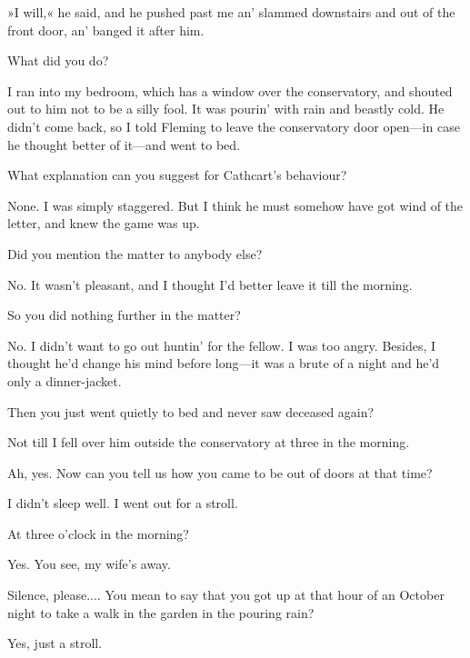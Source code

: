 \begin{dialogue}
»I will,« he said, and he pushed past me an' slammed downstairs and out of the front door, an' banged it after him.

 What did you do?

 I ran into my bedroom, which has a window over the conservatory, and shouted out to him not to be a silly fool. It was pourin' with rain and beastly cold. He didn't come back, so I told Fleming to leave the conservatory door open\allowbreak---\allowbreak in case he thought better of it\allowbreak---\allowbreak and went to bed.

 What explanation can you suggest for Cathcart's behaviour?

 None. I was simply staggered. But I think he must somehow have got wind of the letter, and knew the game was up.

 Did you mention the matter to anybody else?

 No. It wasn't pleasant, and I thought I'd better leave it till the morning.

 So you did nothing further in the matter?

 No. I didn't want to go out huntin' for the fellow. I was too angry. Besides, I thought he'd change his mind before long\allowbreak---\allowbreak it was a brute of a night and he'd only a dinner-jacket.

 Then you just went quietly to bed and never saw deceased again?

 Not till I fell over him outside the conservatory at three in the morning.

 Ah, yes. Now can you tell us how you came to be out of doors at that time?

  I didn't sleep well. I went out for a stroll.

 At three o'clock in the morning?

 Yes.  You see, my wife's away. 

 Silence, please.... You mean to say that you got up at that hour of an October night to take a walk in the garden in the pouring rain?

 Yes, just a stroll. 


\end{dialogue}

